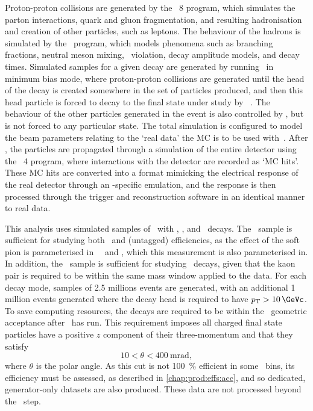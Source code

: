 Proton-proton collisions are generated by the \pythia\ 8 program, which 
simulates the parton interactions, quark and gluon fragmentation, and resulting 
hadronisation and creation of other particles, such as leptons.
The behaviour of the hadrons is simulated by the \evtgen\ program, which models 
phenomena such as branching fractions, neutral meson mixing, \CP\ violation, 
decay amplitude models, and decay times.
Simulated samples for a given decay are generated by running \pythia\ in 
minimum bias mode, where proton-proton collisions are generated until the head 
of the decay is created somewhere in the set of particles produced, and then 
this head particle is forced to decay to the final state under study by 
\evtgen~\cite{Clemencic:2011zza}.
The behaviour of the other particles generated in the event is also controlled 
by \evtgen, but is not forced to any particular state.
The total simulation is configured to model the beam parameters relating to the 
`real data' the \ac{MC} is to be used with~\cite{Belyaev:1322400}.
After \evtgen, the particles are propagated through a simulation of the entire 
detector using the \geant\ 4 program, where interactions with the detector are 
recorded as `\ac{MC} hits'.
These \ac{MC} hits are converted into a format mimicking the electrical 
response of the real detector through an \lhcb-specific emulation, and the 
response is then processed through the trigger and reconstruction software in 
an identical manner to real data.

This analysis uses simulated samples of \DstToDzpi\ with \DzToKpi, \DpToKpipi, 
and \DspToKKpi\ decays.
The \DstToDzpi\ sample is sufficient for studying both \DstToDzpi\ and 
(untagged) \DzToKpi efficiencies, as the effect of the soft pion is 
parameterised in \PDzero\ \pT\ and \rapidity, which this measurement is also 
parameterised in.
In addition, the \DspToKKpi\ sample is sufficient for studying \DspTophipi\ 
decays, given that the kaon pair is required to be within the same mass window 
applied to the data.
For each decay mode, samples of \num{2.5} millions events are generated, with 
an additional \num{1} million events generated where the decay head is required 
to have $\pT > \SI{10}{\GeVc}$.
To save computing resources, the decays are required to be within the \lhcb\ 
geometric acceptance after \evtgen\ has run.
This requirement imposes all charged final state particles have a positive $z$ 
component of their three-momentum and that they satisfy
\begin{equation}
  10 < \theta < \SI{400}{\milli\radian},
  \label{eqn:prod:data:lhcb_acceptance}
\end{equation}
where $\theta$ is the polar angle.
As this cut is not \SI{100}{\percent} efficient in some \pTy\ bins, its 
efficiency must be assessed, as described in \cref{chap:prod:effs:acc}, and so 
dedicated, generator-only datasets are also produced.
These data are not processed beyond the \evtgen\ step.

